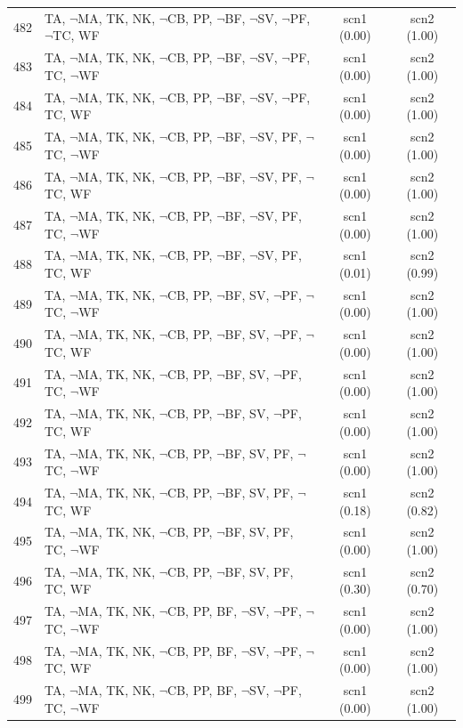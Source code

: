 \documentclass[12pt]{article}
\begin{document}
\begin{longtable}{|l|l|c|c|}
482 & TA, $\neg$MA, TK, NK, $\neg$CB, PP, $\neg$BF, $\neg$SV, $\neg$PF, $\neg$TC, WF & scn1 (0.00) & scn2 (1.00)\\
483 & TA, $\neg$MA, TK, NK, $\neg$CB, PP, $\neg$BF, $\neg$SV, $\neg$PF, TC, $\neg$WF & scn1 (0.00) & scn2 (1.00)\\
484 & TA, $\neg$MA, TK, NK, $\neg$CB, PP, $\neg$BF, $\neg$SV, $\neg$PF, TC, WF & scn1 (0.00) & scn2 (1.00)\\
485 & TA, $\neg$MA, TK, NK, $\neg$CB, PP, $\neg$BF, $\neg$SV, PF, $\neg$TC, $\neg$WF & scn1 (0.00) & scn2 (1.00)\\
486 & TA, $\neg$MA, TK, NK, $\neg$CB, PP, $\neg$BF, $\neg$SV, PF, $\neg$TC, WF & scn1 (0.00) & scn2 (1.00)\\
487 & TA, $\neg$MA, TK, NK, $\neg$CB, PP, $\neg$BF, $\neg$SV, PF, TC, $\neg$WF & scn1 (0.00) & scn2 (1.00)\\
488 & TA, $\neg$MA, TK, NK, $\neg$CB, PP, $\neg$BF, $\neg$SV, PF, TC, WF & scn1 (0.01) & scn2 (0.99)\\
489 & TA, $\neg$MA, TK, NK, $\neg$CB, PP, $\neg$BF, SV, $\neg$PF, $\neg$TC, $\neg$WF & scn1 (0.00) & scn2 (1.00)\\
490 & TA, $\neg$MA, TK, NK, $\neg$CB, PP, $\neg$BF, SV, $\neg$PF, $\neg$TC, WF & scn1 (0.00) & scn2 (1.00)\\
491 & TA, $\neg$MA, TK, NK, $\neg$CB, PP, $\neg$BF, SV, $\neg$PF, TC, $\neg$WF & scn1 (0.00) & scn2 (1.00)\\
492 & TA, $\neg$MA, TK, NK, $\neg$CB, PP, $\neg$BF, SV, $\neg$PF, TC, WF & scn1 (0.00) & scn2 (1.00)\\
493 & TA, $\neg$MA, TK, NK, $\neg$CB, PP, $\neg$BF, SV, PF, $\neg$TC, $\neg$WF & scn1 (0.00) & scn2 (1.00)\\
494 & TA, $\neg$MA, TK, NK, $\neg$CB, PP, $\neg$BF, SV, PF, $\neg$TC, WF & scn1 (0.18) & scn2 (0.82)\\
495 & TA, $\neg$MA, TK, NK, $\neg$CB, PP, $\neg$BF, SV, PF, TC, $\neg$WF & scn1 (0.00) & scn2 (1.00)\\
496 & TA, $\neg$MA, TK, NK, $\neg$CB, PP, $\neg$BF, SV, PF, TC, WF & scn1 (0.30) & scn2 (0.70)\\
497 & TA, $\neg$MA, TK, NK, $\neg$CB, PP, BF, $\neg$SV, $\neg$PF, $\neg$TC, $\neg$WF & scn1 (0.00) & scn2 (1.00)\\
498 & TA, $\neg$MA, TK, NK, $\neg$CB, PP, BF, $\neg$SV, $\neg$PF, $\neg$TC, WF & scn1 (0.00) & scn2 (1.00)\\
499 & TA, $\neg$MA, TK, NK, $\neg$CB, PP, BF, $\neg$SV, $\neg$PF, TC, $\neg$WF & scn1 (0.00) & scn2 (1.00)\\

\end{longtable}
\end{document}
